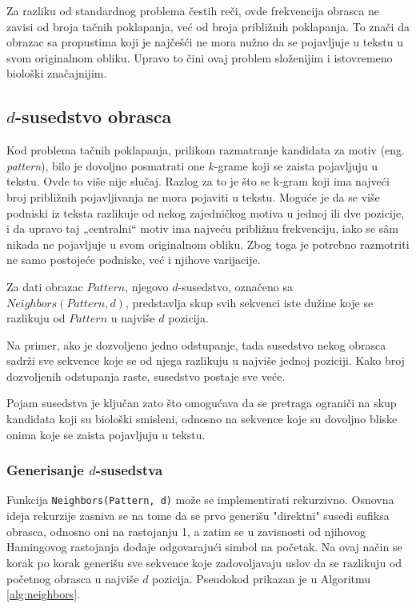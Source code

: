 \documentclass[12pt,oneside]{memoir}
\begin{document}
Za razliku od standardnog problema čestih reči, ovde frekvencija obrasca ne zavisi od broja tačnih poklapanja, već od broja približnih poklapanja. To znači da obrazac sa propustima  koji je najčešći ne mora nužno da se pojavljuje u tekstu u svom originalnom obliku. Upravo to čini ovaj problem složenijim i istovremeno biološki značajnijim.



\subsection{$d$-susedstvo obrasca}


Kod problema tačnih poklapanja, prilikom razmatranje kandidata za motiv (eng. \textit{pattern}), bilo je dovoljno posmatrati one $k$-grame koji se zaista pojavljuju u tekstu. Ovde to više nije slučaj. Razlog za to je što se k-gram koji ima najveći broj približnih pojavljivanja ne mora pojaviti u tekstu. Moguće je da se više podniski iz teksta razlikuje od nekog zajedničkog motiva u jednoj ili dve pozicije, i da upravo taj „centralni“ motiv ima najveću približnu frekvenciju, iako se s\^am nikada ne pojavljuje u svom originalnom obliku. Zbog toga je potrebno razmotriti ne samo postojeće podniske, već i njihove varijacije.


Za dati obrazac $Pattern$, njegovo $d$-susedstvo, označeno sa $Neighbors(Pattern, d)$, predstavlja skup svih sekvenci iste dužine koje se razlikuju od $Pattern$ u najviše $d$ pozicija.

Na primer, ako je dozvoljeno jedno odstupanje, tada susedstvo nekog obrasca sadrži sve sekvence koje se od njega razlikuju u najviše jednoj poziciji. Kako broj dozvoljenih odstupanja raste, susedstvo postaje sve veće.

Pojam susedstva je ključan zato što omogućava da se pretraga ograniči na skup kandidata koji su biološki smisleni, odnosno na sekvence koje su dovoljno bliske onima koje se zaista pojavljuju u tekstu.

\subsubsection{Generisanje $d$-susedstva}

Funkcija \texttt{Neighbors(Pattern, d)} može se implementirati rekurzivno. Osnovna ideja rekurzije zasniva se na tome da se prvo generišu "direktni" susedi sufiksa obrasca, odnosno oni na rastojanju 1, a zatim se u zavisnosti od njihovog Hamingovog rastojanja dodaje odgovarajući simbol na početak. Na ovaj način se korak po korak generišu sve sekvence koje zadovoljavaju uslov da se razlikuju od početnog obrasca u najviše $d$ pozicija. Pseudokod prikazan je u Algoritmu \ref{alg:neighbors}.
\end{document}
